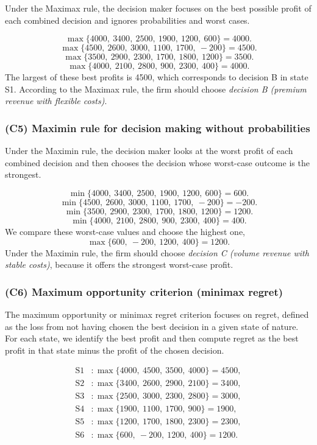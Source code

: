Under the Maximax rule, the decision maker focuses on the best possible profit of each combined decision and ignores
probabilities and worst cases.

\[
\max\{4000,\ 3400,\ 2500,\ 1900,\ 1200,\ 600\}=4000.
\]
\[
\max\{4500,\ 2600,\ 3000,\ 1100,\ 1700,\ -200\}=4500.
\]
\[
\max\{3500,\ 2900,\ 2300,\ 1700,\ 1800,\ 1200\}=3500.
\]
\[
\max\{4000,\ 2100,\ 2800,\ 900,\ 2300,\ 400\}=4000.
\]
The largest of these best profits is 4500, which corresponds to decision B in state S1. According to the Maximax rule, the
firm should choose \emph{decision B (premium revenue with flexible costs)}.

\subsubsection{(C5) Maximin rule for decision making without probabilities}\label{subsubsec:example3-c5}

Under the Maximin rule, the decision maker looks at the worst profit of each combined decision and then chooses the
decision whose worst-case outcome is the strongest.

\[
\min\{4000,\ 3400,\ 2500,\ 1900,\ 1200,\ 600\}=600.
\]
\[
\min\{4500,\ 2600,\ 3000,\ 1100,\ 1700,\ -200\}=-200.
\]
\[
\min\{3500,\ 2900,\ 2300,\ 1700,\ 1800,\ 1200\}=1200.
\]
\[
\min\{4000,\ 2100,\ 2800,\ 900,\ 2300,\ 400\}=400.
\]
We compare these worst-case values and choose the highest one,
\[
\max\{600,\ -200,\ 1200,\ 400\}=1200.
\]
Under the Maximin rule, the firm should choose \emph{decision C (volume revenue with stable costs)}, because it offers the
strongest worst-case profit.

\subsubsection{(C6) Maximum opportunity criterion (minimax regret)}\label{subsubsec:example3-c6}

The maximum opportunity or minimax regret criterion focuses on regret, defined as the loss from not having chosen the best
decision in a given state of nature. For each state, we identify the best profit and then compute regret as the best profit
in that state minus the profit of the chosen decision.

\[
\begin{aligned}
\text{S1}&\colon \max\{4000,\ 4500,\ 3500,\ 4000\}=4500,\\
\text{S2}&\colon \max\{3400,\ 2600,\ 2900,\ 2100\}=3400,\\
\text{S3}&\colon \max\{2500,\ 3000,\ 2300,\ 2800\}=3000,\\
\text{S4}&\colon \max\{1900,\ 1100,\ 1700,\ 900\}=1900,\\
\text{S5}&\colon \max\{1200,\ 1700,\ 1800,\ 2300\}=2300,\\
\text{S6}&\colon \max\{600,\ -200,\ 1200,\ 400\}=1200.
\end{aligned}
\]


